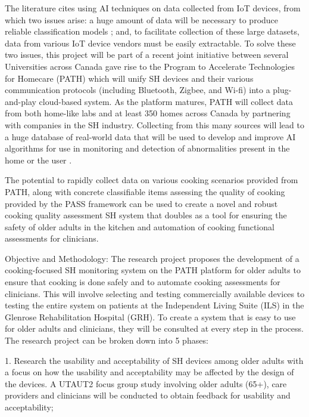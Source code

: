 The literature cites using AI techniques on data collected from IoT devices, from which two issues arise: a huge amount of data will be necessary to produce reliable classification models \cite{sarker_machine_2021}; and, to facilitate collection of these large datasets, data from various IoT device vendors must be easily extractable. To solve these two issues, this project will be part of a recent joint initiative between several Universities across Canada gave rise to the Program to Accelerate Technologies for Homecare (PATH) which will unify SH devices and their various communication protocols (including Bluetooth, Zigbee, and Wi-fi) into a plug-and-play cloud-based system. As the platform matures, PATH will collect data from both home-like labs and at least 350 homes across Canada by partnering with companies in the SH industry. Collecting from this many sources will lead to a huge database of real-world data that will be used to develop and improve AI algorithms for use in monitoring and detection of abnormalities present in the home or the user \cite{path_path_nodate}.

The potential to rapidly collect data on various cooking scenarios provided from PATH, along with concrete classifiable items assessing the quality of cooking provided by the PASS framework can be used to create a novel and robust cooking quality assessment SH system that doubles as a tool for ensuring the safety of older adults in the kitchen and automation of cooking functional assessments for clinicians.

Objective and Methodology: The research project proposes the development of a cooking-focused SH monitoring system on the PATH platform for older adults to ensure that cooking is done safely and to automate cooking assessments for clinicians. This will involve selecting and testing commercially available devices to testing the entire system on patients at the Independent Living Suite (ILS) in the Glenrose Rehabilitation Hospital (GRH). To create a system that is easy to use for older adults and clinicians, they will be consulted at every step in the process. The research project can be broken down into 5 phases:

1.     Research the usability and acceptability of SH devices among older adults with a focus on how the usability and acceptability may be affected by the design of the devices. A UTAUT2 focus group study involving older adults (65+), care providers and clinicians will be conducted to obtain feedback for usability and acceptability;

